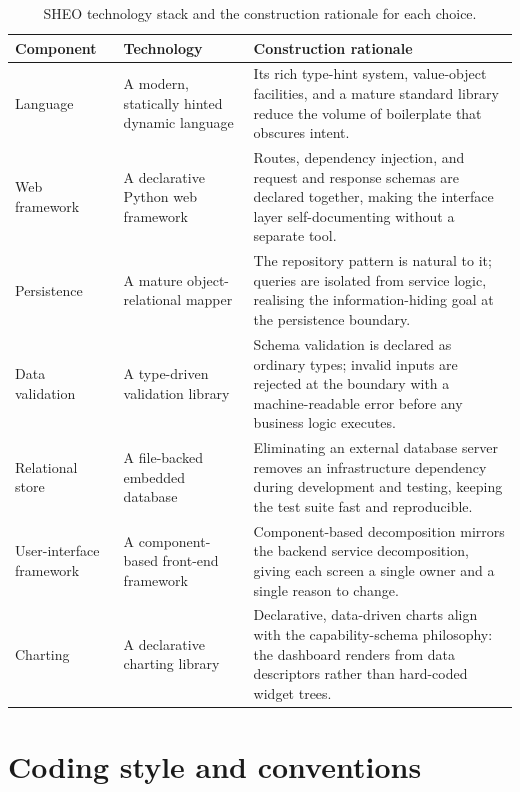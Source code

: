 \begin{table}[htbp]
\centering
\caption{SHEO technology stack and the construction rationale for each choice.}
\label{tab:stack}
\begin{tabularx}{\textwidth}{L{0.22\textwidth} L{0.18\textwidth} Y}
\toprule
\textbf{Component} & \textbf{Technology} & \textbf{Construction rationale} \\
\midrule
Language & A modern, statically hinted dynamic language &
  Its rich type-hint system, value-object facilities, and a mature standard library
  reduce the volume of boilerplate that obscures intent. \\
Web framework & A declarative Python web framework~\cite{fastapi} &
  Routes, dependency injection, and request and response schemas are declared
  together, making the interface layer self-documenting without a separate tool. \\
Persistence & A mature object-relational mapper~\cite{sqlalchemy} &
  The repository pattern is natural to it; queries are isolated from
  service logic, realising the information-hiding goal at the persistence boundary. \\
Data validation & A type-driven validation library &
  Schema validation is declared as ordinary types; invalid inputs are rejected at the
  boundary with a machine-readable error before any business logic executes. \\
Relational store & A file-backed embedded database &
  Eliminating an external database server removes an infrastructure dependency during
  development and testing, keeping the test suite fast and reproducible. \\
\midrule
User-interface framework & A component-based front-end framework~\cite{react} &
  Component-based decomposition mirrors the backend service decomposition, giving
  each screen a single owner and a single reason to change. \\
Charting & A declarative charting library &
  Declarative, data-driven charts align with the capability-schema philosophy: the
  dashboard renders from data descriptors rather than hard-coded widget trees. \\
\bottomrule
\end{tabularx}
\end{table}

\section{Coding style and conventions}
\label{sec:coding-style}

